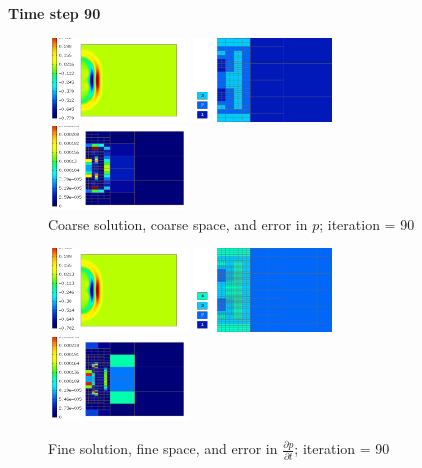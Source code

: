 \textbf{Time step 90}
\begin{figure}[H]
		\includegraphics[width=0.33\textwidth]{img/acoustics/Solution_90.png}\hspace{1mm}
		\includegraphics[width=0.33\textwidth]{img/acoustics/Space_90.png}\hspace{1mm}
		\includegraphics[width=0.33\textwidth]{img/acoustics/ErrorValue_90.png}\\
		\caption{Coarse solution, coarse space, and error in $p$; iteration = 90}
\vspace{5mm}
		\includegraphics[width=0.33\textwidth]{img/acoustics/RefSolution_90.png}\hspace{1mm}
		\includegraphics[width=0.33\textwidth]{img/acoustics/RefSpace_90.png}\hspace{1mm}
		\includegraphics[width=0.33\textwidth]{img/acoustics/ErrorDerivative_90.png}\\
		\caption{Fine solution, fine space, and error in $\frac{\partial p}{\partial t}$; iteration = 90}
	\end{figure}
	

